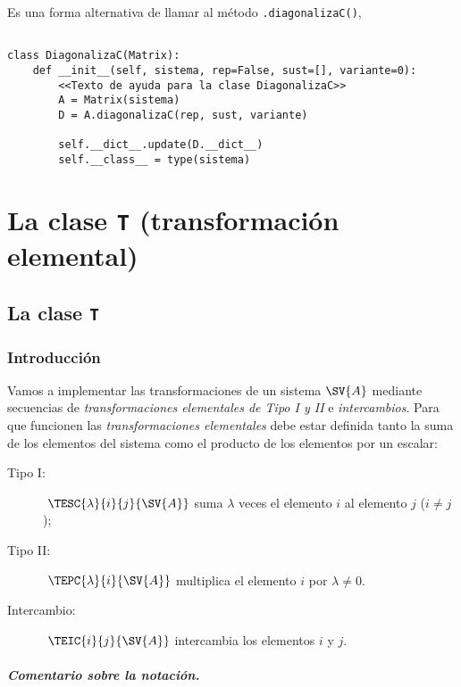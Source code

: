 \documentclass[11pt]{report}
\begin{document}
Es una forma alternativa de llamar al método \texttt{.diagonalizaC()},

\begin{verbatim}

class DiagonalizaC(Matrix):
    def __init__(self, sistema, rep=False, sust=[], variante=0):
        <<Texto de ayuda para la clase DiagonalizaC>>
        A = Matrix(sistema)
        D = A.diagonalizaC(rep, sust, variante)
            
        self.__dict__.update(D.__dict__)
        self.__class__ = type(sistema)

\end{verbatim}




\part{La clase \texttt{T} (transformación elemental)}
\label{sec:org669009a}

\chapter{La clase \texttt{T}}
\label{sec:org698da30}

\section{Introducción}
\label{sec:org51618c9}

Vamos a implementar las transformaciones de un sistema \(\SV{A}\)
mediante secuencias de \emph{transformaciones elementales de Tipo I y II} e
\emph{intercambios}. Para que funcionen las \emph{transformaciones elementales}
debe estar definida tanto la suma de los elementos del sistema como el
producto de los elementos por un escalar:

\begin{description}
\item[{Tipo I:}] \(~\TESC{\lambda}{i}{j}{\SV{A}}\) suma \(\lambda\) veces el
elemento \(i\) al elemento \(j\) (\(i\ne j\));
\item[{Tipo II:}] \(~\TEPC{\lambda}{i}{\SV{A}}\) multiplica el elemento \(i\) por
\(\lambda\ne0\).
\item[{Intercambio:}] \(~\TEIC{i}{j}{\SV{A}}\) intercambia los elementos \(i\) y
\(j\).
\end{description}

\subsubsection{Comentario sobre la notación.}
\label{sec:org3e9b678}
\end{document}
